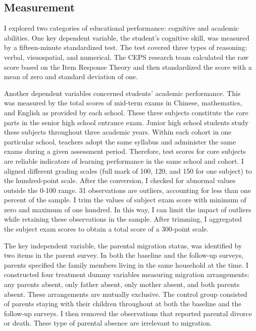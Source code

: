 \documentclass[
  man,floatsintext]{apa7}
\begin{document}
\hypertarget{measurement}{%
\subsection{Measurement}\label{measurement}}

I explored two categories of educational performance: cognitive and academic abilities. One key dependent variable, the student's cognitive skill, was measured by a fifteen-minute standardized test. The test covered three types of reasoning: verbal, visuospatial, and numerical. The CEPS research team calculated the raw score based on the Item Response Theory and then standardized the score with a mean of zero and standard deviation of one.

Another dependent variables concerned students' academic performance. This was measured by the total scores of mid-term exams in Chinese, mathematics, and English as provided by each school. These three subjects constitute the core parts in the senior high school entrance exam. Junior high school students study these subjects throughout three academic years. Within each cohort in one particular school, teachers adopt the same syllabus and administer the same exams during a given assessment period. Therefore, test scores for core subjects are reliable indicators of learning performance in the same school and cohort. I aligned different grading scales (full mark of 100, 120, and 150 for one subject) to the hundred-point scale. After the conversion, I checked for abnormal values outside the 0-100 range. 31 observations are outliers, accounting for less than one percent of the sample. I trim the values of subject exam score with minimum of zero and maximum of one hundred. In this way, I can limit the impact of outliers while retaining these observations in the sample. After trimming, I aggregated the subject exam scores to obtain a total score of a 300-point scale.

The key independent variable, the parental migration status, was identified by two items in the parent survey. In both the baseline and the follow-up surveys, parents specified the family members living in the same household at the time. I constructed four treatment dummy variables measuring migration arrangements: any parents absent, only father absent, only mother absent, and both parents absent. These arrangements are mutually exclusive. The control group consisted of parents staying with their children throughout at both the baseline and the follow-up surveys. I then removed the observations that reported parental divorce or death. These type of parental absence are irrelevant to migration.
\end{document}
